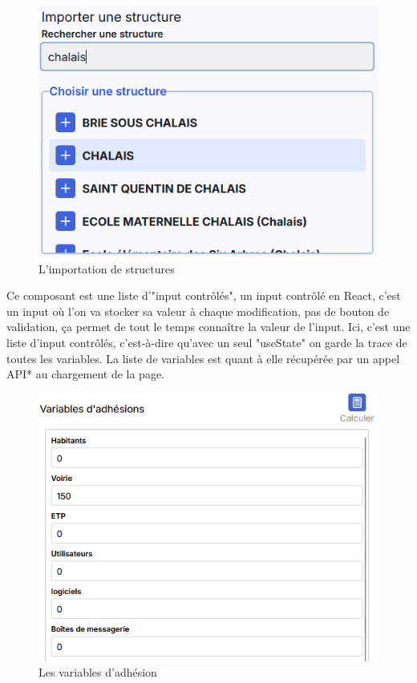 \documentclass[a4paper,12pt]{report}
\begin{document}
\begin{figure}[H]
    \centering
    \includegraphics[scale=0.6]{import.png}
    \caption{L'importation de structures}
    \label{fig:import-struc}
\end{figure}

Ce composant est une liste d'"input contrôlés", un input contrôlé en React, c'est un input où l'on va stocker sa valeur à chaque modification, pas de bouton de validation, ça permet de tout le temps connaître la valeur de l'input. Ici, c'est une liste d'input contrôlés, c'est-à-dire qu'avec un seul "useState" on garde la trace de toutes les variables. La liste de variables est quant à elle récupérée par un appel API* au chargement de la page.

\begin{figure}[H]
    \centering
    \includegraphics[scale=0.4]{adheVar.png}
    \caption{Les variables d'adhésion}
    \label{fig:adhe-var}
\end{figure}
\end{document}
